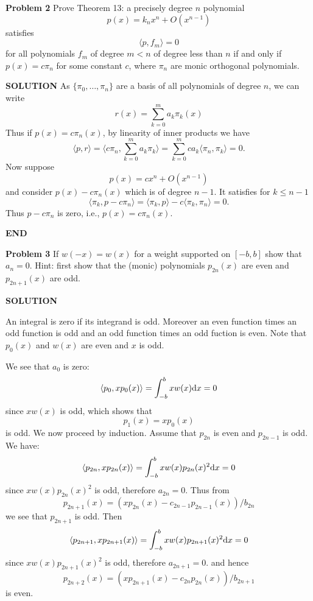 \documentclass[12pt,a4paper]{article}
\begin{document}
\textbf{Problem 2} Prove Theorem 13: a precisely degree $n$ polynomial
\[
p(x) = k_n x^n + O(x^{n-1})
\]
satisfies
\[
\ensuremath{\langle}p,f_m\ensuremath{\rangle} = 0
\]
for all  polynomials $f_m$ of degree $m < n$ of degree less than $n$ if and only if $p(x) = c \ensuremath{\pi}_n$ for some constant $c$, where $\ensuremath{\pi}_n$ are monic orthogonal polynomials.

\textbf{SOLUTION} As $\{\ensuremath{\pi}_0,\ensuremath{\ldots},\ensuremath{\pi}_n\}$ are a basis of all polynomials of degree $n$, we can write
\[
r(x) = \ensuremath{\sum}_{k=0}^m a_k \ensuremath{\pi}_k(x)
\]
Thus if $p(x) = c \ensuremath{\pi}_n(x)$, by linearity of inner products we have
\[
\ensuremath{\langle}p,r\ensuremath{\rangle} = \ensuremath{\langle}c\ensuremath{\pi}_n,\ensuremath{\sum}_{k=0}^m a_k \ensuremath{\pi}_k\ensuremath{\rangle} = \ensuremath{\sum}_{k=0}^m ca_k \ensuremath{\langle}\ensuremath{\pi}_n, \ensuremath{\pi}_k\ensuremath{\rangle} = 0.
\]
Now suppose
\[
p(x) = c x^n + O(x^{n-1})
\]
and consider $p(x) - c \ensuremath{\pi}_n(x)$ which is of degree $n-1$. It satisfies for $k \ensuremath{\leq} n-1$
\[
\ensuremath{\langle}\ensuremath{\pi}_k, p - c \ensuremath{\pi}_n\ensuremath{\rangle} = \ensuremath{\langle}\ensuremath{\pi}_k, p\ensuremath{\rangle} - c \ensuremath{\langle}\ensuremath{\pi}_k, \ensuremath{\pi}_n\ensuremath{\rangle} = 0.
\]
Thus $p - c \ensuremath{\pi}_n$ is zero, i.e., $p(x) = c \ensuremath{\pi}_n(x)$.

\textbf{END}

\textbf{Problem 3} If $w(-x) = w(x)$ for a weight supported on $[-b,b]$ show that $a_n = 0$. Hint: first show that the (monic) polynomials $p_{2n}(x)$ are even and $p_{2n+1}(x)$ are odd.

\textbf{SOLUTION}

An integral is zero if its integrand is odd. Moreover an even function times an odd function is odd and an odd function times an odd fuction is even. Note that $p_0(x)$ and $w(x)$ are even and $x$ is odd.

We see that $a_0$ is zero:
\[
\ensuremath{\langle}p_0,x p_0(x)\ensuremath{\rangle} = \int_{-b}^b x w(x) {\rm d} x = 0
\]
since $xw(x)$ is odd, which shows that
\[
p_1(x) = xp_0(x)
\]
is odd. We now proceed by induction. Assume that $p_{2n}$ is even and $p_{2n-1}$ is odd. We have:
\[
\ensuremath{\langle}p_{2n},x p_{2n}(x)\ensuremath{\rangle} = \int_{-b}^b x w(x) p_{2n}(x)^2 {\rm d} x = 0
\]
since $x w(x) p_{2n}(x)^2$ is odd, therefore $a_{2n} = 0$. Thus from
\[
p_{2n+1}(x) = (x p_{2n}(x)- c_{2n-1} p_{2n-1}(x)) / b_{2n}
\]
we see that $p_{2n+1}$ is odd. Then
\[
\ensuremath{\langle}p_{2n+1},x p_{2n+1}(x)\ensuremath{\rangle} = \int_{-b}^b x w(x) p_{2n+1}(x)^2 {\rm d} x = 0
\]
since $x w(x) p_{2n+1}(x)^2$ is odd, therefore $a_{2n+1} = 0$. and hence
\[
p_{2n+2}(x) = (x p_{2n+1}(x)- c_{2n} p_{2n}(x)) / b_{2n+1}
\]
is even.
\end{document}
